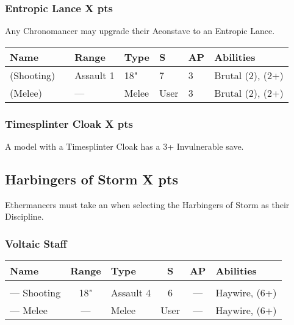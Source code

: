 \subsubsection[Entropic Lance ]{Entropic Lance  \hrulefill X pts} \label{Entropic Lance}

Any Chronomancer may upgrade their Aeonstave to an Entropic Lance.

\noindent
\begin{tabular}{||m{130pt} m{10pt} m{31pt} m{55pt} m{12pt} m{12pt} m{210pt}||}
	\hline
	Name & & Range & Type & S & AP & Abilities \\
	\hline
	\quickref{Entropic Lance} (Shooting) & & Assault 1 & 18" & 7 & 3 & Brutal (2), \quickref{Entropic Strike} (2+) \\
	\quickref{Entropic Lance} (Melee) & & — & Melee & User & 3 & Brutal (2), \quickref{Entropic Strike} (2+) \\
	\hline
\end{tabular}

\subsubsection[Timesplinter Cloak ]{Timesplinter Cloak  \hrulefill X pts}

A model with a Timesplinter Cloak has a 3+ Invulnerable save.


\subsection[Harbingers of Storm ]{Harbingers of Storm  \hrulefill X pts}

Ethermancers must take an  when selecting the Harbingers of Storm as their Discipline.

\subsubsection{Voltaic Staff}
\label{Voltaic Staff}
\noindent
\begin{NiceTabular}{L{115 pt} c C{40pt} *{2}{c} >{\raggedright\arraybackslash}p{240pt}}
	Name & Range & Type & S & AP & Abilities \\
	\hline
	 &  &  &  &  & \\
	— Shooting & 18" & Assault 4 & 6 & — & Haywire,  (6+) \\
	— Melee & — & Melee & User & — & Haywire,  (6+) \\
\end{NiceTabular}


